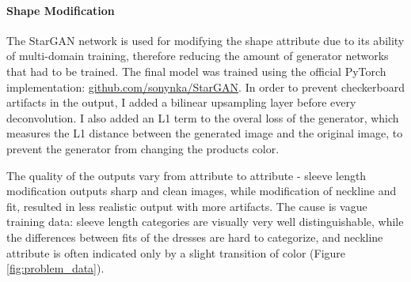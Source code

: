 \documentclass[12pt]{report}
\begin{document}
\paragraph{Shape Modification}
The StarGAN \cite{choi_stargan_2017} network is used for modifying the shape attribute due to its ability of multi-domain training, therefore reducing the amount of generator networks that had to be trained. The final model was trained using the official PyTorch implementation: \hyperlink{https://github.com/sonynka/StarGAN}{github.com/sonynka/StarGAN}. In order to prevent checkerboard artifacts in the output, I added a bilinear upsampling layer before every deconvolution. I also added an L1 term to the overal loss of the generator, which measures the L1 distance between the generated image and the original image, to prevent the generator from changing the products color.

The quality of the outputs vary from attribute to attribute - sleeve length modification outputs sharp and clean images, while modification of neckline and fit, resulted in less realistic output with more artifacts. The cause is vague training data: sleeve length categories are visually very well distinguishable, while the differences between fits of the dresses are hard to categorize, and neckline attribute is often indicated only by a slight transition of color (Figure \ref{fig:problem_data}).
\end{document}

